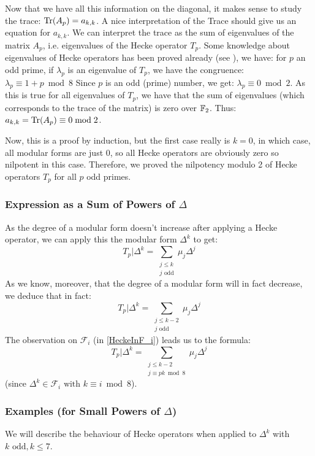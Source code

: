 Now that we have all this information on the diagonal, it makes sense to study the trace: 
$\text{Tr}(A_p) = a_{k,k}$.
A nice interpretation of the Trace should give us an equation for $a_{k,k}$.
We can interpret the trace as the sum of eigenvalues of the matrix $A_p$, i.e. eigenvalues of the Hecke operator $T_p$.
Some knowledge about eigenvalues of Hecke operators has been proved already (see \cite{EigenvaluesOfHeckeOperators}), we have:
for $p$ an odd prime, if $\lambda_p$ is an eigenvalue of $T_p$, we have the congruence: $\lambda_p \equiv 1+p \bmod 8$
Since $p$ is an odd (prime) number, we get: $\lambda_p \equiv 0 \bmod 2$.
As this is true for all eigenvalues of $T_p$, we have that the sum of eigenvalues (which corresponds to the trace of the matrix) is zero over $\mathbb{F}_2$.
Thus: 
$a_{k,k} = \text{Tr}(A_p) \equiv 0 \bmod 2$.

Now, this is a proof by induction, but the first case really is $k=0$, in which case, all modular forms are just $0$, so all Hecke operators are obviously zero so nilpotent in this case.
Therefore, we proved the nilpotency modulo 2 of Hecke operators $T_p$ for all $p$ odd primes.

\subsubsection[Expression for $T_p|\Delta^k$]{Expression as a Sum of Powers of $\Delta$}
As the degree of a modular form doesn't increase after applying a Hecke operator, we can apply this the modular form $\Delta^k$ to get:
$$
T_p|\Delta^k = \sum_{\substack{j \leq k \\ j \text{ odd}}} \mu_j\Delta^j
$$
As we know, moreover, that the degree of a modular form will in fact decrease, we deduce that in fact:
\[
T_p|\Delta^k = \sum_{\substack{j \leq k-2\\ j \text{ odd}}} \mu_j\Delta^j
\label{eq:TpDelta^k} \tag{*}
\]
The observation on $\mathcal{F}_i$ (in \ref{HeckeInF_i}) leads us to the formula:
\[
T_p|\Delta^k = \sum_{\substack{j \leq k-2\\ j \equiv pk \bmod 8}} \mu_j\Delta^j
\label{eq:TpDelta^k_bis} \tag{**}
\]
(since $\Delta^k \in \mathcal{F}_i \text{ with } k \equiv i \bmod 8$).

\subsubsection{Examples (for Small Powers of $\Delta$)}
\label{examplesSmallPowersDelta}
We will describe the behaviour of Hecke operators when applied to $\Delta^k$ with $k \text{ odd}, k \leq 7$.

